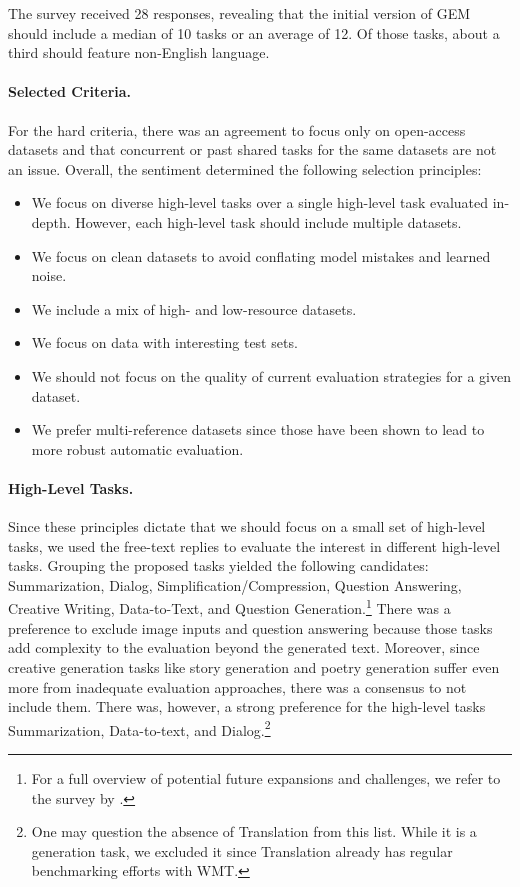 \documentclass[11pt,a4paper]{article}
\begin{document}
The survey received 28 responses, revealing that the initial version of GEM should include a median of 10 tasks or an average of 12. Of those tasks, about a third should feature non-English language. 

\paragraph{Selected Criteria.} For the hard criteria, there was an agreement to focus only on open-access datasets and that concurrent or past shared tasks for the same datasets are not an issue. Overall, the sentiment determined the following selection principles: 
\begin{itemize}[itemsep=0mm]
    \item We focus on diverse high-level tasks over a single high-level task evaluated in-depth. However, each high-level task should include multiple datasets. 
    \item We focus on clean datasets to avoid conflating model mistakes and learned noise.
    \item We include a mix of high- and low-resource datasets.
    \item We focus on data with interesting test sets. 
    \item We should not focus on the quality of current evaluation strategies for a given dataset.
    \item We prefer multi-reference datasets since those have been shown to lead to more robust automatic evaluation.
\end{itemize}

\paragraph{High-Level Tasks.} Since these principles dictate that we should focus on a small set of high-level tasks, we used the free-text replies to evaluate the interest in different high-level tasks. Grouping the proposed tasks yielded the following candidates: Summarization, Dialog, Simplification/Compression, Question Answering, Creative Writing, Data-to-Text, and Question Generation.\footnote{For a full overview of potential future expansions and challenges, we refer to the survey by \citet{gatt2018survey}.}  
There was a preference to exclude image inputs and question answering because those tasks add complexity to the evaluation beyond the generated text. 
Moreover, since creative generation tasks like story generation and poetry generation suffer even more from inadequate evaluation approaches, there was a consensus to not include them.
There was, however, a strong preference for the high-level tasks Summarization, Data-to-text, and Dialog.\footnote{One may question the absence of Translation from this list. While it is a generation task, we excluded it since Translation already has regular benchmarking efforts with WMT.} 
\end{document}
